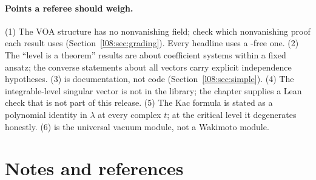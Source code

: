 \paragraph{Points a referee should weigh.}
(1) The VOA structure has no nonvanishing field; check which nonvanishing proof each result uses
(Section~\ref{l08:sec:grading}). Every headline uses a -free one. (2) The ``level is a theorem'' results
are about coefficient systems within a fixed ansatz; the converse statements about all vectors carry explicit
independence hypotheses. (3) \allowbreak{} is documentation, not code
(Section~\ref{l08:sec:simple}). (4) The integrable-level singular vector is not in the library; the chapter
supplies a Lean check that is not part of this release. (5) The Kac formula is stated as a polynomial identity in $\lambda$ at every complex $t$; at the
critical level it degenerates honestly. (6)  is the universal vacuum module, not a Wakimoto
module.

\section{Notes and references}\label{l08:sec:notes}

